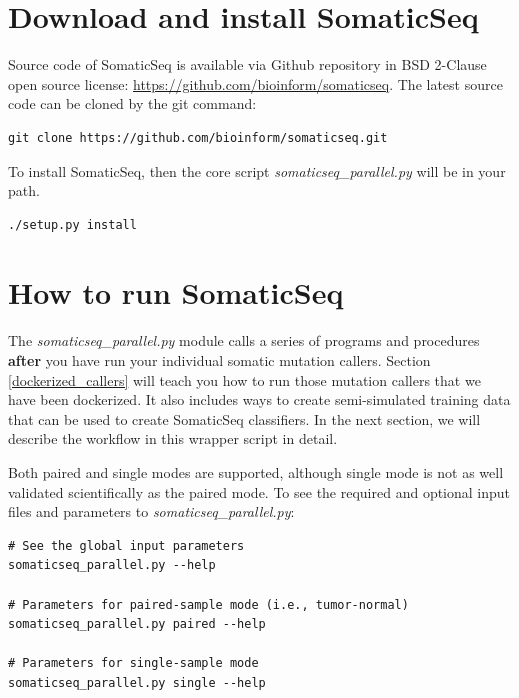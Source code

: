 \documentclass[10pt,letterpaper]{article}
\begin{document}
\begin{sloppypar}
\begin{itemize}
\end{itemize}



\section{Download and install SomaticSeq} \label{download_somaticseq}

Source code of SomaticSeq is available via Github repository in BSD 2-Clause open source license: \href{https://github.com/bioinform/somaticseq}{https://github.com/bioinform/somaticseq}. The latest source code can be cloned by the git command:
\begin{lstlisting}
git clone https://github.com/bioinform/somaticseq.git
\end{lstlisting}


To install SomaticSeq, then the core script \textit{somaticseq\_parallel.py} will be in your path. 
\begin{lstlisting}
./setup.py install
\end{lstlisting}


\section{How to run SomaticSeq} \label{Wrapper_script}

The \textit{somaticseq\_parallel.py} module calls a series of programs and procedures \textbf{after} you have run your individual somatic mutation callers. Section \ref{dockerized_callers} will teach you how to run those mutation callers that we have been dockerized. It also includes ways to create semi-simulated training data that can be used to create SomaticSeq classifiers. In the next section, we will describe the workflow in this wrapper script in detail. 

Both paired and single modes are supported, although single mode is not as well validated scientifically as the paired mode. To see the required and optional input files and parameters to \textit{somaticseq\_parallel.py}:

\begin{lstlisting}
# See the global input parameters
somaticseq_parallel.py --help

# Parameters for paired-sample mode (i.e., tumor-normal)
somaticseq_parallel.py paired --help

# Parameters for single-sample mode
somaticseq_parallel.py single --help
\end{lstlisting}



\end{sloppypar}
\end{document}
